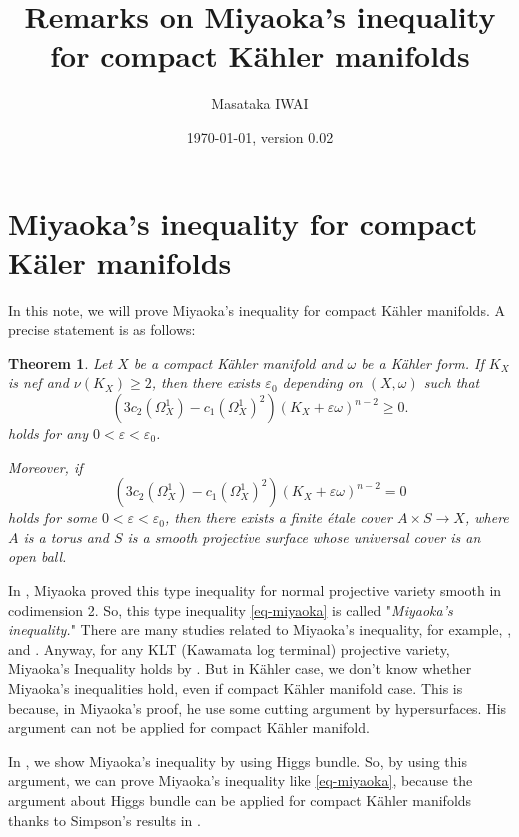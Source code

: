 \documentclass[12pt]{amsart}
\title[Remarks on Miyaoka's inequality for compact K\"ahler manifolds]
{Remarks on Miyaoka's inequality \\ for compact K\"ahler manifolds}
\author{Masataka IWAI}
\date{\today, version 0.02}
\newtheorem{thm}{Theorem}[section]
\theoremstyle{definition}
\theoremstyle{remark}
\numberwithin{equation}{section}
\begin{document}
\maketitle
%
%


\section{Miyaoka's inequality for compact K\"aler manifolds}

In this note, we will prove Miyaoka's inequality for compact K\"ahler manifolds.
A precise statement is as follows:

\begin{thm}
\label{thm-Miyaoka-inequality-kahler}
Let $X$ be a compact K\"ahler manifold and $\omega$ be a K\"ahler form.
If $K_X$ is nef and $\nu(K_X) \ge 2$, then there exists $\varepsilon_{0}$ depending on $(X, \omega)$ such that 
\begin{equation}
\label{eq-miyaoka}
\left( 3c_2(\Omega_{X}^{1}) - c_{1} (\Omega_{X}^{1})^2\right)(K_{X} + \varepsilon \omega)^{n-2}\ge 0.
\end{equation}
holds for any $0 < \varepsilon < \varepsilon_{0}$.

Moreover, 
if 
$$\left( 3c_2(\Omega_{X}^{1}) - c_{1} (\Omega_{X}^{1})^2 \right)(K_{X} + \varepsilon \omega)^{n-2} = 0$$
 holds for some $0 < \varepsilon < \varepsilon_{0}$, then 
there exists a finite \'etale cover $A \times S \rightarrow X$, where $A$ is a torus and $S$ is a smooth projective surface whose universal cover is an open ball.
\end{thm}

In \cite{Miy87}, Miyaoka proved this type inequality for normal projective variety smooth in codimension 2. So, this type inequality \eqref{eq-miyaoka} is called "\textit{Miyaoka's inequality.}"
There are many studies related to Miyaoka's inequality, for example, \cite{Lan02}, \cite{RT16} and \cite{RT22}. 
Anyway, for any KLT (Kawamata log terminal) projective variety,  Miyaoka's Inequality holds by \cite{IMM24}.
But in  K\"ahler case, we don't know whether  Miyaoka's inequalities hold, even if compact K\"ahler manifold case. This is because, in Miyaoka's proof, he use some cutting argument by hypersurfaces.  His argument can not be applied for compact K\"ahler manifold.

In \cite{IMM24}, we show Miyaoka's inequality by using Higgs bundle. So, by using this argument, we can prove Miyaoka's inequality like \eqref{eq-miyaoka}, because the argument about Higgs bundle can be applied for compact K\"ahler manifolds thanks to Simpson's results in \cite{Sim88}.
\end{document}

